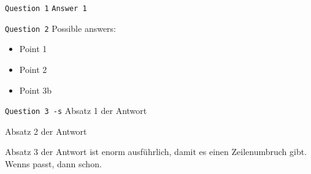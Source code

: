 


\texttt{Question 1}
\texttt{Answer 1}



\texttt{Question 2}
Possible answers:
\begin{itemize}
\item Point 1
\item Point 2
\item Point 3b
\end{itemize}



\texttt{Question 3 -s}
Absatz 1 der Antwort

Absatz 2 der Antwort

Absatz 3 der Antwort ist enorm ausführlich, damit es einen Zeilenumbruch gibt. Wenns passt, dann schon.



